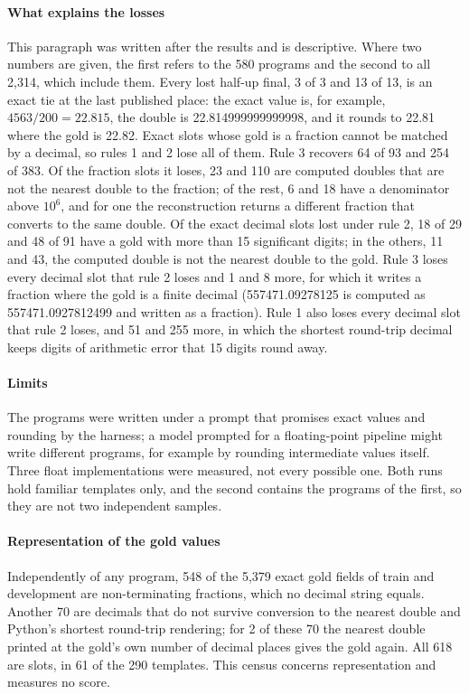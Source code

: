 \documentclass[conference]{IEEEtran}
\begin{document}
\paragraph*{What explains the losses} This paragraph was written after the results and is descriptive. Where two numbers are given, the first refers to the 580 programs and the second to all 2,314, which include them. Every lost half-up final, 3 of 3 and 13 of 13, is an exact tie at the last published place: the exact value is, for example, $4563/200=22.815$, the double is 22.814999999999998, and it rounds to 22.81 where the gold is 22.82. Exact slots whose gold is a fraction cannot be matched by a decimal, so rules 1 and 2 lose all of them. Rule 3 recovers 64 of 93 and 254 of 383. Of the fraction slots it loses, 23 and 110 are computed doubles that are not the nearest double to the fraction; of the rest, 6 and 18 have a denominator above $10^6$, and for one the reconstruction returns a different fraction that converts to the same double. Of the exact decimal slots lost under rule 2, 18 of 29 and 48 of 91 have a gold with more than 15 significant digits; in the others, 11 and 43, the computed double is not the nearest double to the gold. Rule 3 loses every decimal slot that rule 2 loses and 1 and 8 more, for which it writes a fraction where the gold is a finite decimal (557471.09278125 is computed as 557471.0927812499 and written as a fraction). Rule 1 also loses every decimal slot that rule 2 loses, and 51 and 255 more, in which the shortest round-trip decimal keeps digits of arithmetic error that 15 digits round away.

\paragraph*{Limits} The programs were written under a prompt that promises exact values and rounding by the harness; a model prompted for a floating-point pipeline might write different programs, for example by rounding intermediate values itself. Three float implementations were measured, not every possible one. Both runs hold familiar templates only, and the second contains the programs of the first, so they are not two independent samples.

\paragraph*{Representation of the gold values} Independently of any program, 548 of the 5,379 exact gold fields of train and development are non-terminating fractions, which no decimal string equals. Another 70 are decimals that do not survive conversion to the nearest double and Python's shortest round-trip rendering; for 2 of these 70 the nearest double printed at the gold's own number of decimal places gives the gold again. All 618 are slots, in 61 of the 290 templates. This census concerns representation and measures no score.
\end{document}
